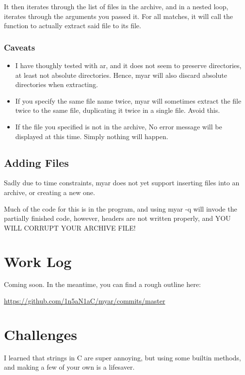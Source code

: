 \documentclass[letterpaper,10pt,titlepage]{article}
\begin{document}
It then iterates through the list of files in the archive, and in a nested loop, iterates through the arguments you passed it.  For all matches, it will call the function to actually extract said file to its file.

\subsubsection{Caveats}

\begin{itemize}
\item I have thoughly tested with ar, and it does not seem to preserve directories, at least not absolute directories.  Hence, myar will also discard absolute directories when extracting.
\item If you specify the same file name twice, myar will sometimes extract the file twice to the same file, duplicating it twice in a single file.  Avoid this.
\item If the file you specified is not in the archive, No error message will be displayed at this time.  Simply nothing will happen.
\end{itemize}

\subsection{Adding Files}

Sadly due to time constraints, myar does not yet support inserting files into an archive, or creating a new one.

Much of the code for this is in the program, and using myar -q will invode the partially finished code, however, headers are not written properly, and YOU WILL CORRUPT YOUR ARCHIVE FILE!

\section{Work Log}

Coming soon.  In the meantime, you can find a rough outline here:

\url{https://github.com/1n5aN1aC/myar/commits/master}

\section{Challenges}

I learned that strings in C are super annoying, but using some builtin methods, and making a few of your own is a lifesaver.
\end{document}
